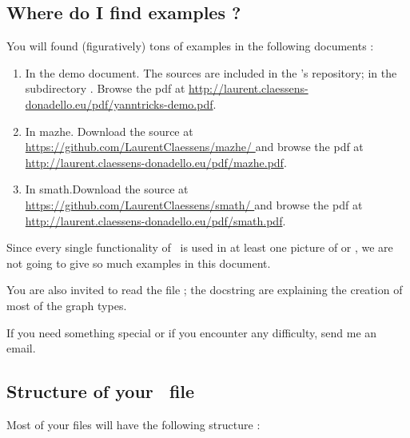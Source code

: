 \subsection{Where do I find examples ?}

You will found (figuratively) tons of examples in the following documents :
\begin{enumerate}
    \item
        In the demo document. The sources are included in the \yanntricks's repository; in the subdirectory . Browse the pdf at \url{http://laurent.claessens-donadello.eu/pdf/yanntricks-demo.pdf}.
    \item
        In mazhe. Download the source at \url{ https://github.com/LaurentClaessens/mazhe/ } and browse the pdf at \url{http://laurent.claessens-donadello.eu/pdf/mazhe.pdf}.
    \item
        In smath.Download the source at \url{ https://github.com/LaurentClaessens/smath/ } and browse the pdf at \url{http://laurent.claessens-donadello.eu/pdf/smath.pdf}.
\end{enumerate}
Since every single functionality of \yanntricks\ is used in at least one picture of  or , we are not going to give so much examples in this document.

You are also invited to read the file ; the docstring are explaining the creation of most of the graph types.

If you need something special or if you encounter any difficulty, send me an email.

\subsection{Structure of your \yanntricks\ file}

Most of your \yanntricks files will have the following structure :



